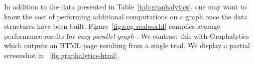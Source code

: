 \documentclass[conference]{IEEEtran}
\begin{document}

In addition to the data presented in Table~\ref{tab:graphalytics}, one may want to know the cost of performing additional computations on a graph once the data structures have been built. Figure~\ref{fig:epg-realworld} compiles average performance results for \emph{easy-parallel-graph-\textasteriskcentered}. We contrast this with Graphalytics which outputs an HTML page resulting from a single trial. We display a partial screenshot in \figurename~\ref{fig:graphalytics-html}.
\end{document}
